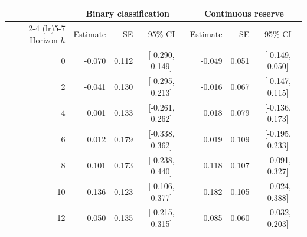 \begin{tabular}{r r r c r r c}
\toprule
 & \multicolumn{3}{c}{Binary classification} & \multicolumn{3}{c}{Continuous reserve} \\
\cmidrule(lr){2-4} \cmidrule(lr){5-7}
Horizon $h$ & Estimate & SE & 95\% CI & Estimate & SE & 95\% CI \\
\midrule
0 & -0.070 & 0.112 & [-0.290, 0.149] & -0.049 & 0.051 & [-0.149, 0.050] \\
2 & -0.041 & 0.130 & [-0.295, 0.213] & -0.016 & 0.067 & [-0.147, 0.115] \\
4 & 0.001 & 0.133 & [-0.261, 0.262] & 0.018 & 0.079 & [-0.136, 0.173] \\
6 & 0.012 & 0.179 & [-0.338, 0.362] & 0.019 & 0.109 & [-0.195, 0.233] \\
8 & 0.101 & 0.173 & [-0.238, 0.440] & 0.118 & 0.107 & [-0.091, 0.327] \\
10 & 0.136 & 0.123 & [-0.106, 0.377] & 0.182 & 0.105 & [-0.024, 0.388] \\
12 & 0.050 & 0.135 & [-0.215, 0.315] & 0.085 & 0.060 & [-0.032, 0.203] \\
\bottomrule
\end{tabular}
